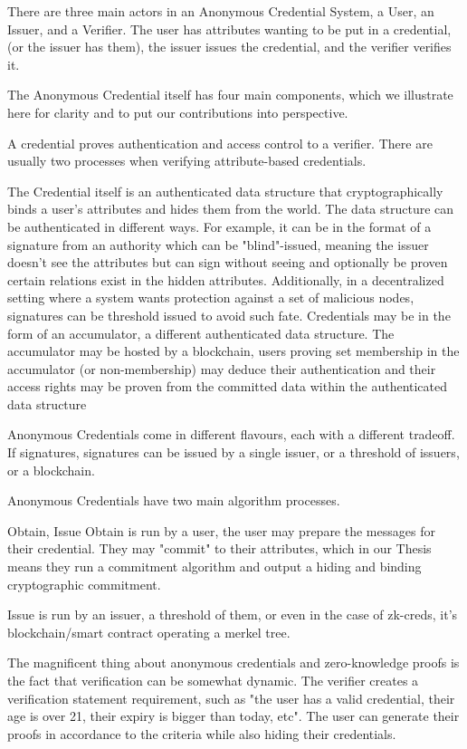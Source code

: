 There are three main actors in an Anonymous Credential System, a User, an Issuer, and a Verifier. 
The user has attributes wanting to be put in a credential, (or the issuer has them), the issuer issues the credential, and the verifier verifies it. 

The Anonymous Credential itself has four main components, which we illustrate here for clarity and to put our contributions into perspective. 

A credential proves authentication and access control to a verifier. 
There are usually two processes when verifying attribute-based credentials. 

The Credential itself is an authenticated data structure that cryptographically binds a user's attributes and hides them from the world. The data structure can be authenticated in different ways. For example, it can be in the format of a signature from an authority which can be "blind"-issued, meaning the issuer doesn't see the attributes but can sign without seeing and optionally be proven certain relations exist in the hidden attributes. Additionally, in a decentralized setting where a system wants protection against a set of malicious nodes, signatures can be threshold issued to avoid such fate.
Credentials may be in the form of an accumulator, a different authenticated data structure. The accumulator may be hosted by a blockchain, users proving set membership in the accumulator (or non-membership) may deduce their authentication and their access rights may be proven from the committed data within the authenticated data structure

Anonymous Credentials come in different flavours, each with a different tradeoff. If signatures, signatures can be issued by a single issuer, or a threshold of issuers, or a blockchain. 



Anonymous Credentials have two main algorithm processes.

Obtain, Issue
Obtain is run by a user, the user may prepare the messages for their credential. They may "commit" to their attributes, which in our Thesis means they run a commitment algorithm and output a hiding and binding cryptographic commitment. 

Issue is run by an issuer, a threshold of them, or even in the case of zk-creds, it's blockchain/smart contract operating a merkel tree.


The magnificent thing about anonymous credentials and zero-knowledge proofs is the fact that verification can be somewhat dynamic. The verifier creates a verification statement requirement, such as "the user has a valid credential, their age is over 21, their expiry is bigger than today, etc". The user can generate their proofs in accordance to the criteria while also hiding their credentials. 

